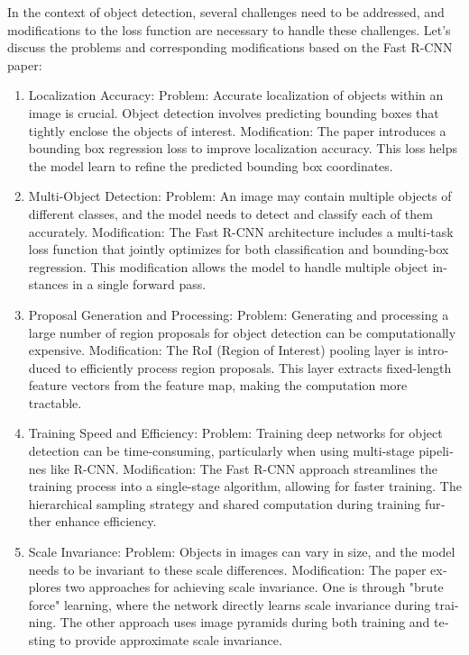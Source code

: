 \documentclass{article}
\begin{document}
\begin{latin}
In the context of object detection, several challenges need to be addressed, and modifications to the loss function are necessary to handle these challenges. Let's discuss the problems and corresponding modifications based on the Fast R-CNN paper:
\begin{enumerate}
    \item Localization Accuracy:
        Problem: Accurate localization of objects within an image is crucial. Object detection involves predicting bounding boxes that tightly enclose the objects of interest.
        Modification: The paper introduces a bounding box regression loss to improve localization accuracy. This loss helps the model learn to refine the predicted bounding box coordinates.

    \item Multi-Object Detection:
        Problem: An image may contain multiple objects of different classes, and the model needs to detect and classify each of them accurately.
        Modification: The Fast R-CNN architecture includes a multi-task loss function that jointly optimizes for both classification and bounding-box regression. This modification allows the model to handle multiple object instances in a single forward pass.

    \item Proposal Generation and Processing:
        Problem: Generating and processing a large number of region proposals for object detection can be computationally expensive.
        Modification: The RoI (Region of Interest) pooling layer is introduced to efficiently process region proposals. This layer extracts fixed-length feature vectors from the feature map, making the computation more tractable.

    \item Training Speed and Efficiency:
        Problem: Training deep networks for object detection can be time-consuming, particularly when using multi-stage pipelines like R-CNN.
        Modification: The Fast R-CNN approach streamlines the training process into a single-stage algorithm, allowing for faster training. The hierarchical sampling strategy and shared computation during training further enhance efficiency.

    \item Scale Invariance:
        Problem: Objects in images can vary in size, and the model needs to be invariant to these scale differences.
        Modification: The paper explores two approaches for achieving scale invariance. One is through "brute force" learning, where the network directly learns scale invariance during training. The other approach uses image pyramids during both training and testing to provide approximate scale invariance.


\end{enumerate}
\end{latin}
\end{document}
